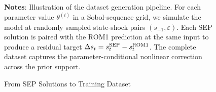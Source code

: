 \begin{figure}[h]
\begin{tikzpicture}[scale=0.9]
\end{tikzpicture}
\caption{From SEP Solutions to Training Dataset}
\label{fig:sep_to_training}
\begin{flushleft}
\footnotesize
\textbf{Notes}: Illustration of the dataset generation pipeline. For each parameter value $\theta^{(i)}$ in a Sobol-sequence grid, we simulate the model at randomly sampled state-shock pairs $(s_{-1}, \varepsilon)$. Each SEP solution is paired with the ROM1 prediction at the same input to produce a residual target $\Delta s_t = s_t^{\rm SEP} - s_t^{\rm ROM1}$. The complete dataset captures the parameter-conditional nonlinear correction across the prior support.
\end{flushleft}
\end{figure}

\clearpage

